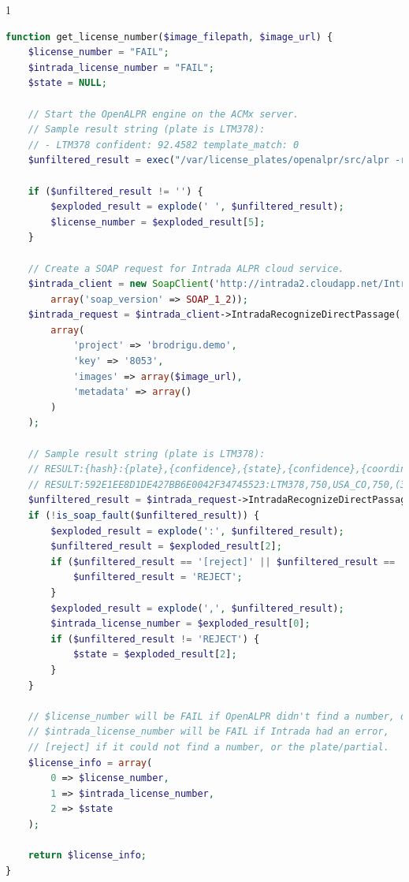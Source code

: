 \documentclass[11pt, oneside, fullpage, doublespace]{article}
\begin{document}
\begin{spacing}{1}
\begin{lstlisting}[language=php]
function get_license_number($image_filepath, $image_url) {
	$license_number = "FAIL";
	$intrada_license_number = "FAIL";
	$state = NULL;

	// Start the OpenALPR engine on the ACMx server.
	// Sample result string (plate is LTM378):
	// - LTM378 confident: 92.4582 template_match: 0
	$unfiltered_result = exec("/var/license_plates/openalpr/src/alpr -r /var/license_plates/openalpr/runtime_data -n 1 $image_filepath");

	if ($unfiltered_result != '') {
		$exploded_result = explode(' ', $unfiltered_result);
		$license_number = $exploded_result[5];
	}

	// Create a SOAP request for Intrada ALPR cloud service.
	$intrada_client = new SoapClient('http://intrada2.cloudapp.net/IntradaService.asmx?WSDL',
		array('soap_version' => SOAP_1_2));
	$intrada_request = $intrada_client->IntradaRecognizeDirectPassage(
		array(
			'project' => 'brodrigu.demo',
			'key' => '8053',
			'images' => array($image_url),
			'metadata' => array()
		)
	);

	// Sample result string (plate is LTM378):
	// RESULT:{hash}:{plate},{confidence},{state},{confidence},{coordinates of license plate in image}:{execution time}
	// RESULT:592E1EE8D1DE427BB6E0042F34745523:LTM378,750,USA_CO,750,(309,156),(503,159),(309,206),(503,207):1594
	$unfiltered_result = $intrada_request->IntradaRecognizeDirectPassageResult;
	if (!is_soap_fault($unfiltered_result)) {
		$exploded_result = explode(':', $unfiltered_result);
		$unfiltered_result = $exploded_result[2];
		if ($unfiltered_result == '[reject]' || $unfiltered_result == 'Could not download file') {
			$unfiltered_result = 'REJECT';
		}
		$exploded_result = explode(',', $unfiltered_result);
		$intrada_license_number = $exploded_result[0];
		if ($unfiltered_result != 'REJECT') {
			$state = $exploded_result[2];
		}
	}

	// $license_number will be FAIL if OpenALPR didn't find a number, or the plate/partial.
	// $intrada_license_number will be FAIL if Intrada had an error,
	// [reject] if it could not find a number, or the plate/partial.
	$license_info = array(
		0 => $license_number,
		1 => $intrada_license_number,
		2 => $state
	);

	return $license_info;
}
\end{lstlisting}
\end{spacing}
\end{document}
